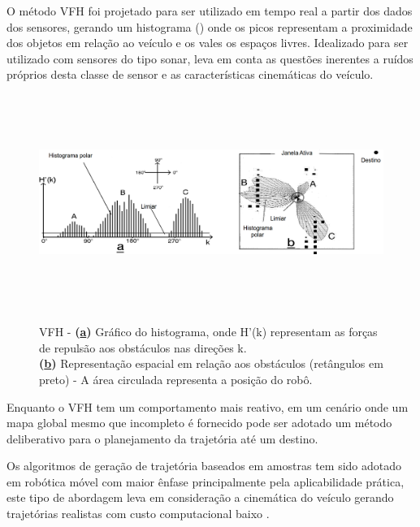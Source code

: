 O método VFH foi projetado para ser utilizado em tempo real a partir dos dados
dos sensores, gerando um histograma () onde os picos representam a
proximidade dos objetos em relação ao veículo e os vales os espaços livres.
Idealizado para ser utilizado com sensores do tipo sonar, leva em conta as
questões inerentes a ruídos próprios desta classe de sensor e as características
cinemáticas do veículo.


\vspace{0.5cm}
\begin{figure}[ht]
	\centering
	\begin{minipage}[b]{1\linewidth}
	    \centering
	    \includegraphics[width=\textwidth,height=7cm]{images/vfh_horiz.png}
	 	\caption{VFH - \textbf{(\underline{a})} Gráfico do histograma, 
	 	onde H'(k) representam as forças de repulsão aos obstáculos nas direções k.\\
	 	\textbf{(\underline{b})} Representação espacial em relação aos 
	 	obstáculos (retângulos em preto) - A área circulada representa a posição do robô.}
	 	\label{fig:vfh}
	\end{minipage}
\end{figure}



Enquanto o VFH tem um comportamento mais reativo, em um cenário onde um mapa
global mesmo que incompleto é fornecido pode ser adotado um método deliberativo
para o planejamento da trajetória até um destino.

Os algoritmos de geração de trajetória baseados em amostras tem sido adotado em
robótica móvel com maior ênfase principalmente pela aplicabilidade prática, este
tipo de abordagem leva em consideração a cinemática do veículo gerando
trajetórias realistas com custo computacional baixo \cite{ompl}.

